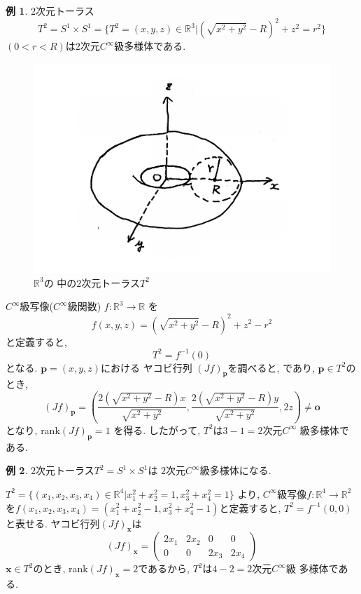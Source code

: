 \documentclass[dvipdfmx,cjk]{beamer}
\theoremstyle{definition}
\newtheorem{ex}{\textbf{ 例 }}
\begin{document}
\begin{frame}
  \frametitle{}
  \begin{ex}
    $2$次元トーラス
    $$T^2=S^1\times S^1=
    \{T^2=(x,y,z)\in \mathbb{R}^3|
    (\sqrt{x^2+y^2}-R)^2+z^2=r^2\} $$
    $(0<r<R)$は$2$次元$C^\infty$級多様体である. 
    \begin{figure}[H]
      \centering
      \includegraphics[keepaspectratio, scale=0.2]{T2Noshadow.pdf}
      \caption{$\mathbb{R}^3$の
      中の$2$次元トーラス$T^2$}
      \label{T2Noshadow}
     \end{figure}
\end{ex}
\end{frame}

\begin{frame}
    $C^\infty$級写像($C^\infty$級関数)
    $f:\mathbb{R}^3\to \mathbb{R}$
    を
    $$f(x,y,z)=(\sqrt{x^2+y^2}-R)^2+z^2-r^2$$
    と定義すると, 
    $$T^2=f^{-1}(0)$$
    となる. $\boldsymbol{p}=(x,y,z)$における
    ヤコビ行列
    $(Jf)_{\boldsymbol{p}}$を調べると, 
    であり, $\boldsymbol{p}\in T^2$のとき, 
    $$(Jf)_{\boldsymbol{p}}=
    \left(\frac{2(\sqrt{x^2+y^2}-R)x}
        {\sqrt{x^2+y^2}},\frac{2(\sqrt{x^2+y^2}-R)y}
        {\sqrt{x^2+y^2}},2z\right)\neq 
        \boldsymbol{o}$$
    となり, rank$(Jf)_{\boldsymbol{p}}=1$
    を得る. 
    したがって, $T^2$は$3-1=2$次元$C^\infty$
    級多様体である. 
\end{frame}

\begin{frame}
  \begin{ex}
    $2$次元トーラス$T^2=S^1\times S^1$は
    $2$次元$C^\infty$級多様体になる.  
  \end{ex}  
  $T^2=\{(x_1,x_2,x_3,x_4)\in \mathbb{R}^4|
  x_1^2+x_2^2=1, x_3^2+x_4^2=1\}$
  より, 
  $C^\infty$級写像$f:\mathbb{R}^4\to \mathbb{R}^2$
  を$f(x_1,x_2,x_3,x_4)=(x_1^2+x_2^2-1,
  x_3^2+x_4^2-1)$と定義すると, 
  $T^2=f^{-1}(0,0)$
  と表せる. ヤコビ行列$(Jf)_{\boldsymbol{x}}$は
  $$(Jf)_{\boldsymbol{x}}=
      \left(\begin{array}{cccc}
          2x_1&2x_2&0&0\\
          0&0&2x_3&2x_4
      \end{array}\right)$$
  $\boldsymbol{x}\in T^2$のとき, 
  rank$(Jf)_{\boldsymbol{x}}=2$であるから, 
  $T^2$は$4-2=2$次元$C^\infty$級
  多様体である.
\end{frame}
\end{document}

